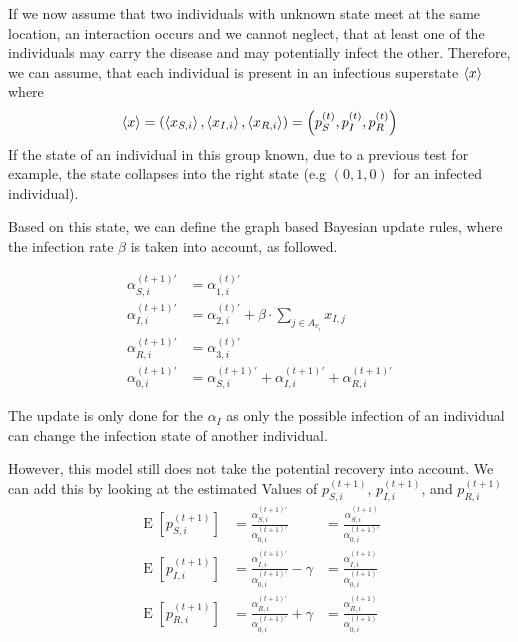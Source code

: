 If we now assume that two individuals with unknown state meet at the same location, an interaction occurs and we cannot neglect, that at least one of the individuals may carry the disease and may potentially infect the other. Therefore, we can assume, that each individual is present in an infectious superstate $\braket{x}$ where
\begin{equation}
    \braket{x} = \left(\braket{x_{S,i}}, \braket{x_{I,i}}, \braket{x_{R,i}}\right) = \left(p_S^{(t)},p_I^{(t)},p_R^{(t)}\right)
\end{equation}
If the state of an individual in this group known, due to a previous test for example, the state collapses into the right state (e.g $(0,1,0)$ for an infected individual).

Based on this state, we can define the graph based Bayesian update rules, where the infection rate $\beta$ is taken into account, as followed.

\begin{align}
    \alpha_{S,i}^{(t+1)\prime} &= \alpha_{1,i}^{(t)\prime}\\
    \alpha_{I,i}^{(t+1)\prime} &= \alpha_{2,i}^{(t)\prime} + \beta \cdot
    \sum_{j\in A_{v_i}}  x_{I,j}\\
    \alpha_{R,i}^{(t+1)\prime} &= \alpha_{3,i}^{(t)\prime}\\
    \alpha_{0,i}^{(t+1)\prime} &= \alpha_{S,i}^{(t+1)\prime}+\alpha_{I,i}^{(t+1)\prime}+\alpha_{R,i}^{(t+1)\prime}
\end{align}

The update is only done for the $\alpha_I$ as only the possible infection of an individual can change the infection state of another individual.

However, this model still does not take the potential recovery into account. We can add this by looking at the estimated Values of $p_{S,i}^{(t+1)}$, $p_{I,i}^{(t+1)}$, and $p_{R,i}^{(t+1)}$ 
\begin{align*}
    \operatorname{E}[p_{S,i}^{(t+1)}] &= \frac{\alpha_{S,i}^{(t+1)\prime}}{\alpha_{0,i}^{(t+1)\prime}} &= \frac{\alpha_{S,i}^{(t+1)}}{\alpha_{0,i}^{(t+1)\prime}} \\
    \operatorname{E}[p_{I,i}^{(t+1)}]&= \frac{\alpha_{I,i}^{(t+1)\prime}}{\alpha_{0,i}^{(t+1)\prime}}-\gamma &=\frac{\alpha_{I,i}^{(t+1)}}{\alpha_{0,i}^{(t+1)}} \\
    \operatorname{E}[p_{R,i}^{(t+1)}]&= \frac{\alpha_{R,i}^{(t+1)\prime}}{\alpha_{0,i}^{(t+1)\prime}}+\gamma &= \frac{\alpha_{R,i}^{(t+1)}}{\alpha_{0,i}^{(t+1)}}
\end{align*}

